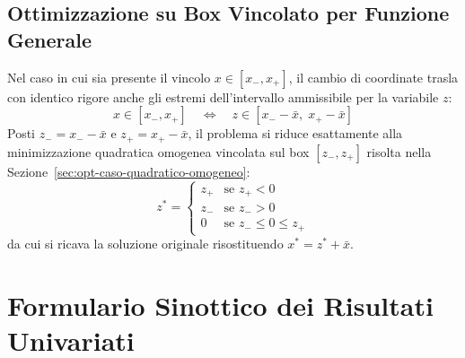 \subsection{Ottimizzazione su Box Vincolato per Funzione Generale}
Nel caso in cui sia presente il vincolo $x \in [x_-, x_+]$, il cambio di coordinate trasla con identico rigore anche gli estremi dell'intervallo ammissibile per la variabile $z$:
\begin{equation}
x \in [x_-, x_+] \quad \Longleftrightarrow \quad z \in [x_- - \bar{x}, \; x_+ - \bar{x}]
\end{equation}
Posti $z_- = x_- - \bar{x}$ e $z_+ = x_+ - \bar{x}$, il problema si riduce esattamente alla minimizzazione quadratica omogenea vincolata sul box $[z_-, z_+]$ risolta nella Sezione~\ref{sec:opt-caso-quadratico-omogeneo}:
\begin{equation}
z^* = \begin{cases}
z_+ & \text{se } z_+ < 0 \\
z_- & \text{se } z_- > 0 \\
0 & \text{se } z_- \le 0 \le z_+
\end{cases}
\end{equation}
da cui si ricava la soluzione originale risostituendo $x^* = z^* + \bar{x}$.


\FloatBarrier
\section{Formulario Sinottico dei Risultati Univariati}
\label{sec:opt-formulario-sinottico}

